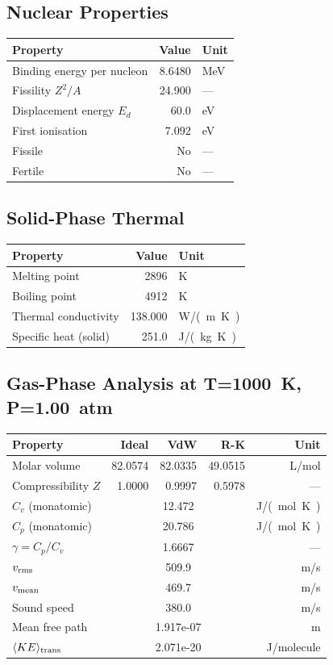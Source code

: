\documentclass[11pt,a4paper]{article}
\begin{document}
\subsection{Nuclear Properties}
\begin{tabular}{lrl}
  \toprule
  Property & Value & Unit \\
  \midrule
  Binding energy per nucleon & 8.6480 & \si{MeV} \\
  Fissility $Z^2/A$ & 24.900 & --- \\
  Displacement energy $E_d$ & 60.0 & \si{eV} \\
  First ionisation & 7.092 & \si{eV} \\
  Fissile & No & --- \\
  Fertile & No & --- \\
  \bottomrule
\end{tabular}

\subsection{Solid-Phase Thermal}
\begin{tabular}{lrl}
  \toprule
  Property & Value & Unit \\
  \midrule
  Melting point & 2896 & \si{K} \\
  Boiling point & 4912 & \si{K} \\
  Thermal conductivity & 138.000 & \si{W/(m.K)} \\
  Specific heat (solid) & 251.0 & \si{J/(kg.K)} \\
  \bottomrule
\end{tabular}

\subsection{Gas-Phase Analysis at T=\SI{1000}{K}, P=\SI{1.00}{atm}}
\begin{tabular}{lrrrr}
  \toprule
  Property & Ideal & VdW & R-K & Unit \\
  \midrule
  Molar volume & 82.0574 & 82.0335 & 49.0515 & \si{L/mol} \\
  Compressibility $Z$ & 1.0000 & 0.9997 & 0.5978 & --- \\
  \midrule
  $C_v$ (monatomic) & \multicolumn{3}{c}{12.472} & \si{J/(mol.K)} \\
  $C_p$ (monatomic) & \multicolumn{3}{c}{20.786} & \si{J/(mol.K)} \\
  $\gamma = C_p/C_v$ & \multicolumn{3}{c}{1.6667} & --- \\
  $v_{\rm rms}$ & \multicolumn{3}{c}{509.9} & \si{m/s} \\
  $v_{\rm mean}$ & \multicolumn{3}{c}{469.7} & \si{m/s} \\
  Sound speed & \multicolumn{3}{c}{380.0} & \si{m/s} \\
  Mean free path & \multicolumn{3}{c}{1.917e-07} & \si{m} \\
  $\langle KE \rangle_{\rm trans}$ & \multicolumn{3}{c}{2.071e-20} & \si{J/molecule} \\
  \bottomrule
\end{tabular}
\end{document}

